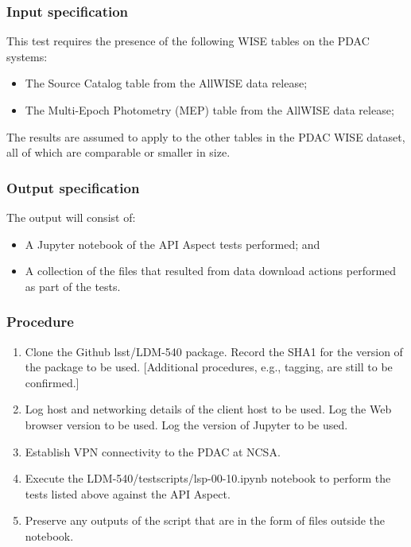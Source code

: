\subsubsection{Input specification}

This test requires the presence of the following WISE tables on the PDAC systems:

\begin{itemize}

  \item{The Source Catalog table from the AllWISE data release;}
  \item{The Multi-Epoch Photometry (MEP) table from the AllWISE data release;}

\end{itemize}

The results are assumed to apply to the other tables in the PDAC WISE dataset, all of which are comparable or smaller in size.

\subsubsection{Output specification}

The output will consist of:

\begin{itemize}
  \item{A Jupyter notebook of the API Aspect tests performed; and}
  \item{A collection of the files that resulted from data download actions performed as part of the tests.}
\end{itemize}


\subsubsection{Procedure}

\begin{enumerate}

  \item{Clone the Github lsst/LDM-540 package.  Record the SHA1 for the version of the package to be used.  [Additional procedures, e.g., tagging, are still to be confirmed.]}
  \item{Log host and networking details of the client host to be used.
 Log the Web browser version to be used.
 Log the version of Jupyter to be used.}
  \item{Establish VPN connectivity to the PDAC at NCSA.}
  \item{Execute the LDM-540/test\textunderscore scripts/lsp-00-10.ipynb notebook to perform the tests listed above against the API Aspect.}
  \item{Preserve any outputs of the script that are in the form of files outside the notebook.}

\end{enumerate}
